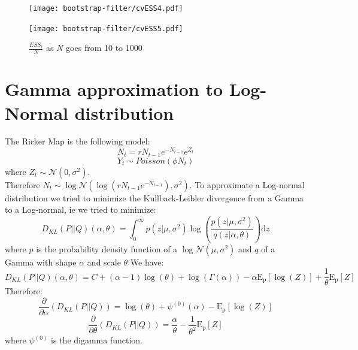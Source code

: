 \documentclass{article}
\begin{document}
\begin{figure}[htb]
	\centering
	\begin{minipage}{.45\textwidth}
		\centering
		\texttt{[image: bootstrap-filter/cvESS4.pdf]}
	\end{minipage}
	\begin{minipage}{.45\textwidth}
		\centering
		\texttt{[image: bootstrap-filter/cvESS5.pdf]}
	\end{minipage}
	\caption{$\frac{ESS_t}{N}$ as $N$ goes from 10 to 1000}
	\label{fig:conv}
\end{figure}

\section*{Gamma approximation to Log-Normal distribution}
The Ricker Map is the following model:
\begin{equation*}
N_t = rN_{t-1}e^{-N_{t-1}}e^{Z_t}
\end{equation*}
\begin{equation*}
Y_t \sim Poisson(\phi N_t)
\end{equation*}
where $Z_t \sim \mathcal{N} (0,\sigma^2)$.\\
Therefore $N_t \sim \log\mathcal{N} (\log{(rN_{t-1}e^{-N_{t-1}})},\sigma^2)$. To approximate a Log-normal distribution we tried to minimize the Kullback-Leibler divergence from a Gamma to a Log-normal, ie we tried to minimize:
\begin{equation*}
D_{KL}(P||Q)(\alpha, \theta) = \int_{0}^{\infty}{p(z|\mu, \sigma^2)\log(\frac{p(z|\mu, \sigma^2)}{q(z|\alpha, \theta)})\mathrm{d}z}
\end{equation*}
where $p$ is the probability density function of a $\log\mathcal{N}(\mu, \sigma^2)$ and $q$ of a Gamma with shape $\alpha$ and scale $\theta$
We have:
\begin{equation*}
D_{KL}(P||Q)(\alpha, \theta) = C + (\alpha-1)\log(\theta) + \log(\Gamma(\alpha)) - \alpha\mathrm{E_p}[\log(Z)] + \frac{1}{\theta}\mathrm{E_p}[Z]
\end{equation*}
Therefore:
\begin{equation*}
\frac{\partial }{\partial \alpha}(D_{KL}(P||Q)) = \log(\theta) + \psi^{(0)}(\alpha)-\mathrm{E_p}[\log(Z)]
\end{equation*}
\begin{equation*}
\frac{\partial }{\partial \theta}(D_{KL}(P||Q)) = \frac{\alpha}{\theta} - \frac{1}{\theta^2}\mathrm{E_p}[Z]
\end{equation*}
where $\psi^{(0)}$ is the digamma function.
\end{document}
